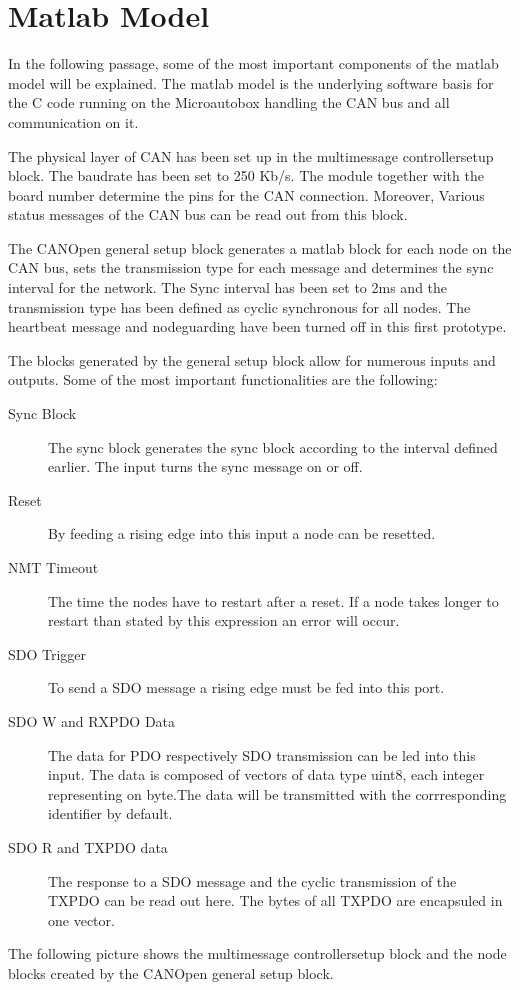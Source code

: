 \section{Matlab Model}

In the following passage, some of the most important components of the matlab model will be explained. The matlab model is the underlying software basis for the C code running on the Microautobox handling the CAN bus and all communication on it.

The physical layer of CAN has been set up in the multimessage controllersetup block. The baudrate has been set to 250 Kb/s. The module together with the board number determine the pins for the CAN connection. Moreover, Various status messages of the CAN bus can be read out from this block.

The CANOpen general setup block generates a matlab block for each node on the CAN bus, sets the transmission type for each message and determines the sync interval for the network. The Sync interval has been set to 2ms and the transmission type has been defined as cyclic synchronous for all nodes. The heartbeat message and nodeguarding have been turned off in this first prototype.

The blocks generated by the general setup block allow for numerous inputs and outputs. Some of the most important functionalities are the following:

\begin{description}
	\item[Sync Block]
	The sync block generates the sync block according to the interval defined earlier. The input turns the sync message on or off.
	\item[Reset] 
	By feeding a rising edge into this input a node can be resetted. 
	\item[NMT Timeout]
	The time the nodes have to restart after a reset. If a node takes longer to restart than stated by this expression an error will occur.
	\item[SDO Trigger]
	To send a SDO message a rising edge must be fed into this port.  
	\item[SDO W and RXPDO Data] 
	The data for PDO respectively SDO transmission can be led into this input. The data is composed of vectors of data type uint8, each integer representing on byte.The data will be transmitted with the corrresponding identifier by default.
	\item[SDO R and TXPDO data] 
	The response to a SDO message and the cyclic transmission of the TXPDO can be read out here. The bytes of all TXPDO are encapsuled in one vector.
	
\end{description}

The following picture shows the multimessage controllersetup block and the node blocks created by the CANOpen general setup block.


